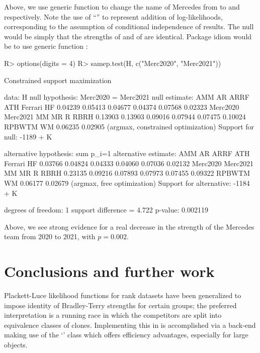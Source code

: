 \documentclass[article]{jss}
\begin{document}
%
Above, we use generic function  to change the name of
Mercedes from  to  and 
respectively.  Note the use of ``\code{+}'' to represent addition of
log-likelihoods, corresponding to the assumption of conditional
independence of results.  The null would be simply that the strengths
of  and of  are identical.  Package
idiom would be to use generic function :
%
\begin{Schunk}
\begin{Sinput}
R> options(digits = 4)
R> samep.test(H, c("Merc2020", "Merc2021"))
\end{Sinput}
\begin{Soutput}
	Constrained support maximization

data:  H
null hypothesis: Merc2020 = Merc2021
null estimate:
     AMM       AR     ARRF      ATH  Ferrari       HF 
 0.04239  0.05413  0.04677  0.04374  0.07568  0.02323 
Merc2020 Merc2021       MM       MR        R     RBRH 
 0.13903  0.13903  0.09016  0.07944  0.07475  0.10024 
  RPBWTM       WM 
 0.06235  0.02905 
(argmax, constrained optimization)
Support for null:  -1189 + K

alternative hypothesis:  sum p_i=1 
alternative estimate:
     AMM       AR     ARRF      ATH  Ferrari       HF 
 0.03766  0.04824  0.04333  0.04060  0.07036  0.02132 
Merc2020 Merc2021       MM       MR        R     RBRH 
 0.23135  0.09216  0.07893  0.07973  0.07455  0.09322 
  RPBWTM       WM 
 0.06177  0.02679 
(argmax, free optimization)
Support for alternative:  -1184 + K

degrees of freedom: 1
support difference = 4.722
p-value: 0.002119 
\end{Soutput}
\end{Schunk}
%
Above, we see strong evidence for a real decrease in the strength of
the Mercedes team from 2020 to 2021, with $p=0.002$.

\section{Conclusions and further work}

Plackett-Luce likelihood functions for rank datasets have been
generalized to impose identity of Bradley-Terry strengths for certain
groups; the preferred interpretation is a running race in which the
competitors are split into equivalence classes of clones.
Implementing this in  is accomplished via a 
back-end making use of the  `' class which offers
efficiency advantages, especially for large objects. 
\end{document}
